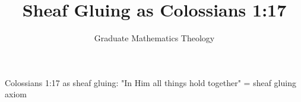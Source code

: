 \documentclass{article}
\begin{document}
\title{Sheaf Gluing as Colossians 1:17}
\author{Graduate Mathematics Theology}
\maketitle

\begin{theorem}

Colossians 1:17 as sheaf gluing:
"In Him all things hold together" = sheaf gluing axiom
            
\end{theorem}
\end{document}
